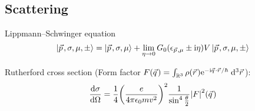 	\subsection{Scattering}
		\noindent
		Lippmann--Schwinger equation
		\begin{equation}
			\Ket{\vec{p},\sigma,\mu,\pm} = \Ket{\vec{p}, \sigma, \mu} + \lim_{\eta \to 0} G_0(\epsilon_{\vec{p},\mu}\pm \i\eta) V \Ket{\vec{p},\sigma,\mu,\pm}
		\end{equation}

		\noindent
		Rutherford cross section (Form factor $F(\vec{q}) = \int_{\mathbb{R}^3} \rho(\vec{r}) \ex^{-\i \vec{q}\cdot\vec{r}/\hbar}\;\dd^3 \vec{r} $):
		\begin{equation}
			\dv{\sigma}{\Omega} = \frac{1}{4} \qty(\frac{e}{4\pi\epsilon_0 m v^2})^2
			\frac{1}{\sin^4\frac{\theta}{2}} \abs{F}^2(\vec{q})
		\end{equation}
